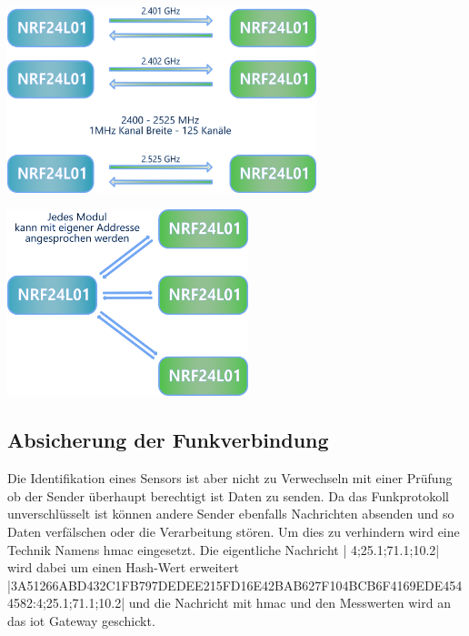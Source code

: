 \documentclass[
  12pt, %
  a4paper, %
  twoside, %
  openany, %
  numbers=noenddot, %
  BCOR=5mm, %
  parskip=half*, %
  thesis, %
]{bfhbook}
\begin{document}
\begin{center}
    \begin{minipage}[b]{0.45\textwidth}
        \centering
        \includegraphics[width=9cm]{Bilder/NRF24Kommunikation.png}
        \captionsetup{justification=centering}
    \end{minipage}\hfill
    \begin{minipage}[b]{0.45\textwidth}
        \centering
        \includegraphics[width=7cm]{Bilder/NRF24Kommunikation-2.png} %
        \captionsetup{justification=centering}
    \end{minipage}
\end{center}
\subsection{Absicherung der Funkverbindung}\label{funkAbsicherung}
Die Identifikation eines Sensors ist aber nicht zu Verwechseln mit einer Prüfung ob der Sender überhaupt berechtigt ist Daten zu senden. Da das Funkprotokoll unverschlüsselt ist können andere Sender ebenfalls Nachrichten absenden und so Daten verfälschen oder die Verarbeitung stören. Um dies zu verhindern wird eine Technik Namens \Gls{hmac} eingesetzt.
Die eigentliche Nachricht | 4;25.1;71.1;10.2| wird dabei um einen Hash-Wert erweitert
|3A51266ABD432C1FB797DEDEE215FD16E42BAB627F104BCB6F4169EDE4544582:4;25.1;71.1;10.2| und die Nachricht mit \Gls{hmac} und den Messwerten wird an das \Gls{iot} Gateway geschickt.
\end{document}
